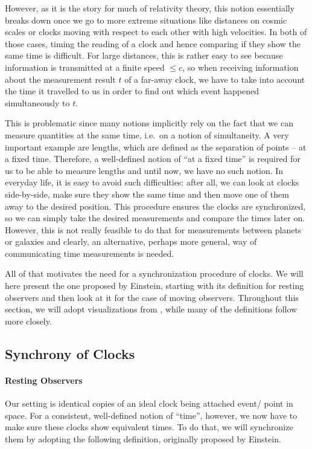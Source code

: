 However, as it is the story for much of relativity theory, this notion essentially breaks down once we go to more extreme situations like distances on cosmic scales or clocks moving with respect to each other with high velocities. In both of those cases, timing the reading of a clock and hence comparing if they show the same time is difficult. For large distances, this is rather easy to see because information is transmitted at a finite speed $\leq c$, so when receiving information about the measurement result $t$ of a far-away clock, we have to take into account the time it travelled to us in order to find out which event happened simultaneously to $t$.

This is problematic since many notions implicitly rely on the fact that we can measure quantities at the same time, i.e.~on a notion of simultaneity. A very important example are lengths, which are defined as the separation of points -- at a fixed time. Therefore, a well-defined notion of \enquote{at a fixed time} is required for us to be able to measure lengths and until now, we have no such notion. In everyday life, it is easy to avoid such difficulties: after all, we can look at clocks side-by-side, make sure they show the same time and then move one of them away to the desired position. This procedure ensures the clocks are synchronized, so we can simply take the desired measurements and compare the times later on. However, this is not really feasible to do that for measurements between planets or galaxies and clearly, an alternative, perhaps more general, way of communicating time measurements is needed.


All of that motivates the need for a synchronization procedure of clocks. We will here present the one proposed by Einstein, starting with its definition for resting observers and then look at it for the case of moving observers. Throughout this section, we will adopt visualizations from \cite{dragon_geometry_srt}, while many of the definitions follow \cite{giulini_srt} more closely.



		\subsection{Synchrony of Clocks}
			\paragraph{Resting Observers}
Our setting is identical copies of an ideal clock being attached event/ point in space. For a consistent, well-defined notion of \enquote{time}, however, we now have to make sure these clocks show equivalent times. To do that, we will synchronize them by adopting the following definition, originally proposed by Einstein.

